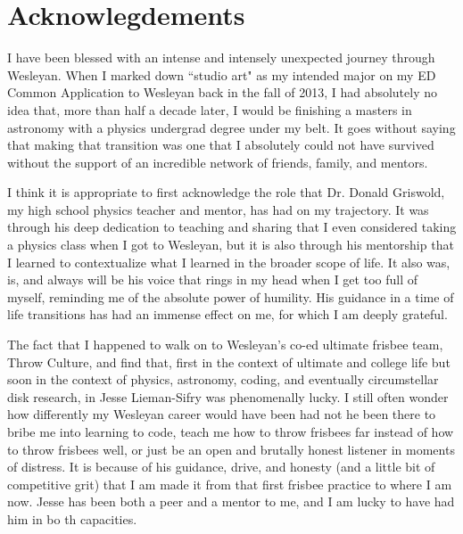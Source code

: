 \chapter{Acknowlegdements}

I have been blessed with an intense and intensely unexpected journey through Wesleyan. When I marked down ``studio art" as my intended major on my ED Common Application to Wesleyan back in the fall of 2013, I had absolutely no idea that, more than half a decade later, I would be finishing a masters in astronomy with a physics undergrad degree under my belt. It goes without saying that making that transition was one that I absolutely could not have survived without the support of an incredible network of friends, family, and mentors.

I think it is appropriate to first acknowledge the role that Dr. Donald Griswold, my high school physics teacher and mentor, has had on my trajectory. It was through his deep dedication to teaching and sharing that I even considered taking a physics class when I got to Wesleyan, but it is also through his mentorship that I learned to contextualize what I learned in the broader scope of life. It also was, is, and always will be his voice that rings in my head when I get too full of myself, reminding me of the absolute power of humility. His guidance in a time of life transitions has had an immense effect on me, for which I am deeply grateful.



The fact that I happened to walk on to Wesleyan's co-ed ultimate frisbee team, Throw Culture, and find that, first in the context of ultimate and college life but soon in the context of physics, astronomy, coding, and eventually circumstellar disk research, in Jesse Lieman-Sifry was phenomenally lucky. I still often wonder how differently my Wesleyan career would have been had not he been there to bribe me into learning to code, teach me how to throw frisbees far instead of how to throw frisbees well, or just be an open and brutally honest listener in moments of distress. It is because of his guidance, drive, and honesty (and a little bit of competitive grit) that I am made it from that first frisbee practice to where I am now. Jesse has been both a peer and a mentor to me, and I am lucky to have had him in bo
th capacities.


